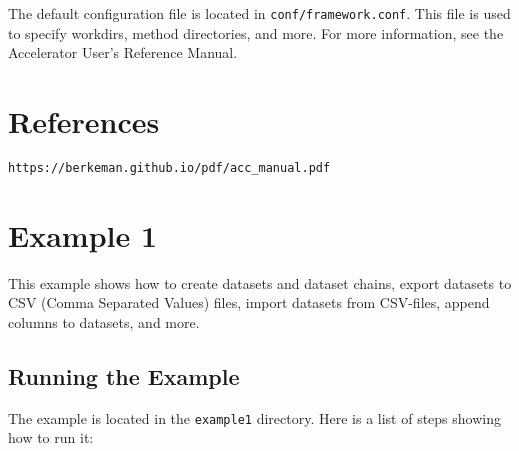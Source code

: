 \documentclass[a4paper]{article}
\begin{document}
The default configuration file is located in
\texttt{conf/framework.conf}.  This file is used to specify workdirs,
method directories, and more.  For more information, see the
Accelerator User's Reference Manual.


\vfill
\section*{References}
\texttt{https://berkeman.github.io/pdf/acc\_manual.pdf}



\clearpage
\section*{Example 1}
This example shows how to create datasets and dataset chains, export
datasets to CSV (Comma Separated Values) files, import datasets from
CSV-files, append columns to datasets, and more.

\subsection*{Running the Example}
The example is located in the \texttt{example1} directory.  Here is a
list of steps showing how to run it:
\end{document}
